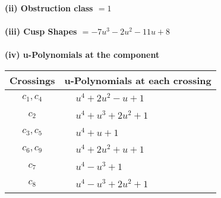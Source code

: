 \documentclass[1p]{elsarticle_modified}
\theoremstyle{definition}
\begin{document}
\flushleft \textbf{(ii) Obstruction class $= 1$}\\~\\
\flushleft \textbf{(iii) Cusp Shapes $= -7 u^3-2 u^2-11 u+8$}\\~\\
\newpage\renewcommand{\arraystretch}{1}
\flushleft \textbf{(iv) u-Polynomials at the component}\newline \\
\begin{tabular}{m{50pt}|m{274pt}}
Crossings & \hspace{64pt}u-Polynomials at each crossing \\
\hline $$\begin{aligned}c_{1},c_{4}\end{aligned}$$&$\begin{aligned}
&u^4+2 u^2- u+1
\end{aligned}$\\
\hline $$\begin{aligned}c_{2}\end{aligned}$$&$\begin{aligned}
&u^4+u^3+2 u^2+1
\end{aligned}$\\
\hline $$\begin{aligned}c_{3},c_{5}\end{aligned}$$&$\begin{aligned}
&u^4+u+1
\end{aligned}$\\
\hline $$\begin{aligned}c_{6},c_{9}\end{aligned}$$&$\begin{aligned}
&u^4+2 u^2+u+1
\end{aligned}$\\
\hline $$\begin{aligned}c_{7}\end{aligned}$$&$\begin{aligned}
&u^4- u^3+1
\end{aligned}$\\
\hline $$\begin{aligned}c_{8}\end{aligned}$$&$\begin{aligned}
&u^4- u^3+2 u^2+1
\end{aligned}$\\
\hline
\end{tabular}\\~\\
\end{document}
